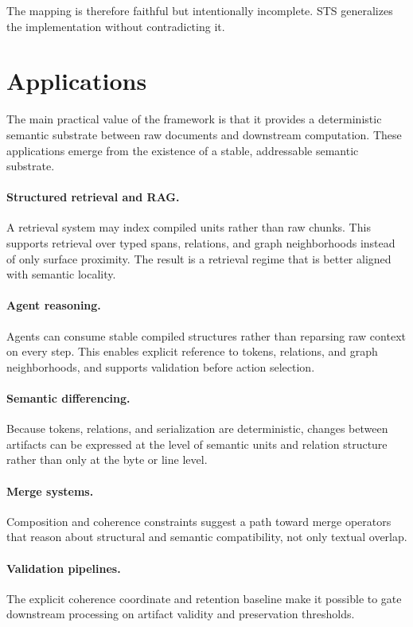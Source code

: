 \documentclass{article}
\newcommand{\STS}{{\normalfont\textsc{STS}}}
\begin{document}
The mapping is therefore faithful but intentionally incomplete. \STS{} generalizes the implementation without contradicting it.

\section{Applications}

The main practical value of the framework is that it provides a deterministic semantic substrate between raw documents and downstream computation. These applications emerge from the existence of a stable, addressable semantic substrate.

\paragraph{Structured retrieval and RAG.}
A retrieval system may index compiled units rather than raw chunks. This supports retrieval over typed spans, relations, and graph neighborhoods instead of only surface proximity. The result is a retrieval regime that is better aligned with semantic locality.

\paragraph{Agent reasoning.}
Agents can consume stable compiled structures rather than reparsing raw context on every step. This enables explicit reference to tokens, relations, and graph neighborhoods, and supports validation before action selection.

\paragraph{Semantic differencing.}
Because tokens, relations, and serialization are deterministic, changes between artifacts can be expressed at the level of semantic units and relation structure rather than only at the byte or line level.

\paragraph{Merge systems.}
Composition and coherence constraints suggest a path toward merge operators that reason about structural and semantic compatibility, not only textual overlap.

\paragraph{Validation pipelines.}
The explicit coherence coordinate and retention baseline make it possible to gate downstream processing on artifact validity and preservation thresholds.
\end{document}
